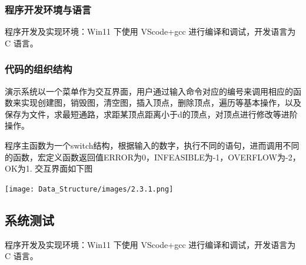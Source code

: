 \documentclass[supercite]{Experimental_Report}
\theoremstyle{definition}
\begin{document}
\subsubsection{程序开发环境与语言}
程序开发及实现环境：Win11 下使用 VScode+gcc 进行编译和调试，开发语言为 C 语言。
\subsubsection{代码的组织结构}
演示系统以一个菜单作为交互界面，用户通过输入命令对应的编号来调用相应的函数来实现创建图，销毁图，清空图，插入顶点，删除顶点，遍历等基本操作，以及保存为文件，求最短通路，求距某顶点距离小于d的顶点，对顶点进行修改等进阶操作。


程序主函数为一个switch结构，根据输入的数字，执行不同的语句，进而调用不同的函数，宏定义函数返回值ERROR为0，INFEASIBLE为-1，OVERFLOW为-2，OK为1.
交互界面如下图



\texttt{[image: Data\_Structure/images/2.3.1.png]}
\vspace{-0.2cm}
\clearpage

\subsection{系统测试}
程序开发及实现环境：Win11 下使用 VScode+gcc 进行编译和调试，开发语言为 C 语言。\par
\end{document}
